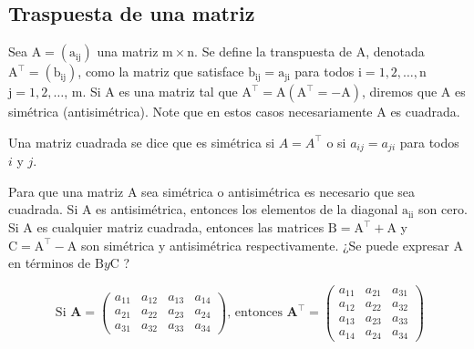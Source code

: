 \subsection{Traspuesta de una matriz}
\begin{definition}
   Sea $\mathrm{A}=\left(\mathrm{a}_{\mathrm{ij}}\right)$ una matriz $\mathrm{m} \times \mathrm{n}$. Se define la transpuesta de $\mathrm{A}$, denotada $\mathrm{A}^{\top}=\left(\mathrm{b}_{\mathrm{ij}}\right)$, como la matriz que satisface $\mathrm{b}_{\mathrm{ij}}=\mathrm{a}_{\mathrm{ji}}$ para todos $\mathrm{i}=1,2, \ldots, \mathrm{n}$ \,\,\,\,  $\mathrm{j}=1,2, \ldots$, $\mathrm{m}$. Si A es una matriz tal que $\mathrm{A}^{\top}=\mathrm{A}\left(\mathrm{A}^{\top}=-\mathrm{A}\right)$, diremos que $\mathrm{A}$ es simétrica (antisimétrica). Note que en estos casos necesariamente A es cuadrada.
\end{definition}
\begin{definition}
Una matriz cuadrada se dice que es simétrica si \( A = A^{\top} \) o si \( a_{ij} = a_{ji} \) para todos \( i \) y \( j \).
    
\end{definition}
\begin{remark}
Para que una matriz $\mathrm{A}$ sea simétrica o antisimétrica es necesario que sea cuadrada. Si $\mathrm{A}$ es antisimétrica, entonces los elementos de la diagonal $\mathrm{a}_{\mathrm{ii}}$ son cero. Si $\mathrm{A}$ es cualquier matriz cuadrada, entonces las matrices $\mathrm{B}=\mathrm{A}^{\top}+\mathrm{A}$ y $\mathrm{C}=\mathrm{A}^{\top}-\mathrm{A}$ son simétrica y antisimétrica respectivamente. ¿Se puede expresar $\mathrm{A}$ en términos de $\mathrm{B} y \mathrm{C}$ ?   
\end{remark}

\begin{example}
$$
\text { Si } \boldsymbol{A}=\left(\begin{array}{llll}
a_{11} & a_{12} & a_{13} & a_{14} \\
a_{21} & a_{22} & a_{23} & a_{24} \\
a_{31} & a_{32} & a_{33} & a_{34}
\end{array}\right) \text {, entonces } \boldsymbol{A}^{\boldsymbol{\top}}=\left(\begin{array}{lll}
a_{11} & a_{21} & a_{31} \\
a_{12} & a_{22} & a_{32} \\
a_{13} & a_{23} & a_{33} \\
a_{14} & a_{24} & a_{34}
\end{array}\right)
$$   
\end{example}

